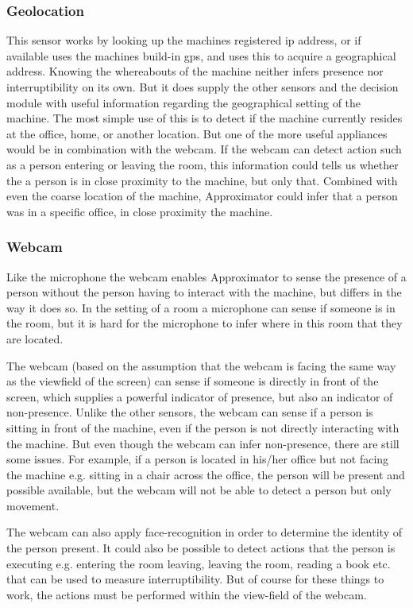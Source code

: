 \documentclass{sigchi}
\begin{document}
\subsubsection{Geolocation}
This sensor works by looking up the machines registered ip address, or if available uses the machines build-in gps, and uses this to acquire a geographical address.
Knowing the whereabouts of the machine neither infers presence nor interruptibility on its own.
But it does supply the other sensors and the decision module with useful information regarding the geographical setting of the machine.
The most simple use of this is to detect if the machine currently resides at the office, home, or another location.
But one of the more useful appliances would be in combination with the webcam.
If the webcam can detect action such as a person entering or leaving the room, this information could tells us whether the a person is in close proximity to the machine, but only that.
Combined with even the coarse location of the machine, Approximator could infer that a person was in a specific office, in close proximity the machine.

\subsubsection{Webcam}
Like the microphone the webcam enables Approximator to sense the presence of a person without the person having to interact with the machine, but differs in the way it does so.
In the setting of a room a microphone can sense if someone is in the room, but it is hard for the microphone to infer where in this room that they are located.

The webcam (based on the assumption that the webcam is facing the same way as the viewfield of the screen) can sense if someone is directly in front of the screen, which supplies a powerful indicator of presence, but also an indicator of non-presence.
Unlike the other sensors, the webcam can sense if a person is sitting in front of the machine, even if the person is not directly interacting with the machine.
But even though the webcam can infer non-presence, there are still some issues.
For example, if a person is located in his/her office but not facing the machine e.g. sitting in a chair across the office, the person will be present and possible available, but the webcam will not be able to detect a person but only movement.

The webcam can also apply face-recognition in order to determine the identity of the person present.
It could also be possible to detect actions that the person is executing e.g. entering the room leaving, leaving the room, reading a book etc. that can be used to measure interruptibility.
But of course for these things to work, the actions must be performed within the view-field of the webcam.
\end{document}
